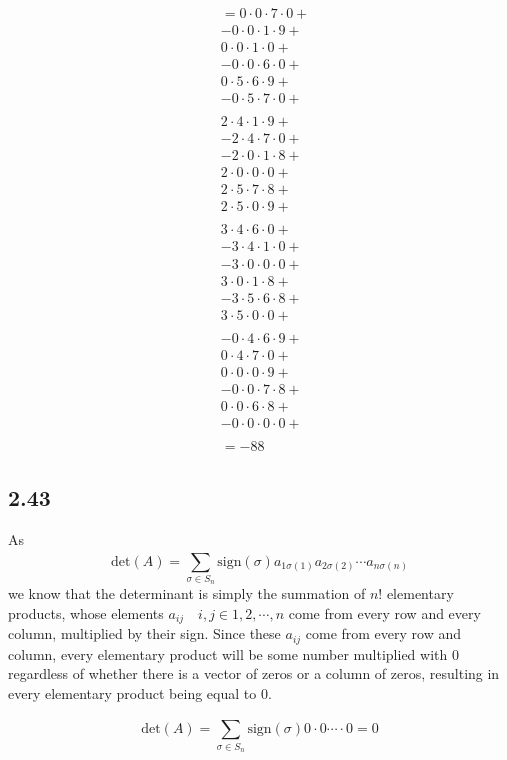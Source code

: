 \documentclass[letterpaper,12pt]{article}
\theoremstyle{definition}
\begin{document}
    \begin{align*}
    &= 0 \cdot 0 \cdot 7 \cdot 0 + \\
    & -0 \cdot 0 \cdot 1 \cdot 9 + \\
    & 0 \cdot 0 \cdot 1 \cdot 0 + \\
    & -0 \cdot 0 \cdot 6 \cdot 0 + \\
    & 0 \cdot 5 \cdot 6 \cdot 9 + \\
    & -0 \cdot 5 \cdot 7 \cdot 0 + \\
    \\
    & 2 \cdot 4 \cdot 1 \cdot 9 + \\
    & -2 \cdot 4 \cdot 7 \cdot 0 + \\
    & -2 \cdot 0 \cdot 1 \cdot 8 + \\
    & 2 \cdot 0 \cdot 0 \cdot 0 + \\
    & 2 \cdot 5 \cdot 7 \cdot 8 + \\
    & 2 \cdot 5 \cdot 0 \cdot 9 + \\
    \\
    & 3 \cdot 4 \cdot 6 \cdot 0 + \\
    & -3 \cdot 4 \cdot 1 \cdot 0 + \\
    & -3 \cdot 0 \cdot 0 \cdot 0 + \\
    & 3 \cdot 0 \cdot 1 \cdot 8 + \\
    & -3 \cdot 5 \cdot 6 \cdot 8 + \\
    & 3 \cdot 5 \cdot 0 \cdot 0 + \\
    \\
    & -0 \cdot 4 \cdot 6 \cdot 9 + \\
    & 0 \cdot 4 \cdot 7 \cdot 0 + \\
    & 0 \cdot 0 \cdot 0 \cdot 9 + \\
    & -0 \cdot 0 \cdot 7 \cdot 8 + \\
    & 0 \cdot 0 \cdot 6 \cdot 8 + \\
    & -0 \cdot 0 \cdot 0 \cdot 0 + \\
    \\
    & = -88
\end{align*}


\subsection*{2.43}
As 
\[\text{det}(A) = \sum^{}_{\sigma \in S_n} \text{sign} (\sigma) a_{1 \sigma (1)}a_{2 \sigma (2)}\cdots a_{n \sigma (n)}\]
we know that the determinant is simply the summation of $n!$ elementary products, whose elements $a_{ij} \quad i,j \in 1,2,\cdots,n$ come from every row and every column, multiplied by their sign. Since these $a_{ij}$ come from every row and column, every elementary product will be some number multiplied with 0 regardless of whether there is a vector of zeros or a column of zeros, resulting in every elementary product being equal to 0.

\[\text{det}(A) = \sum^{}_{\sigma \in S_n} \text{sign} (\sigma) 0 \cdot 0 \cdots \cdot 0 = 0\]
\end{document}
